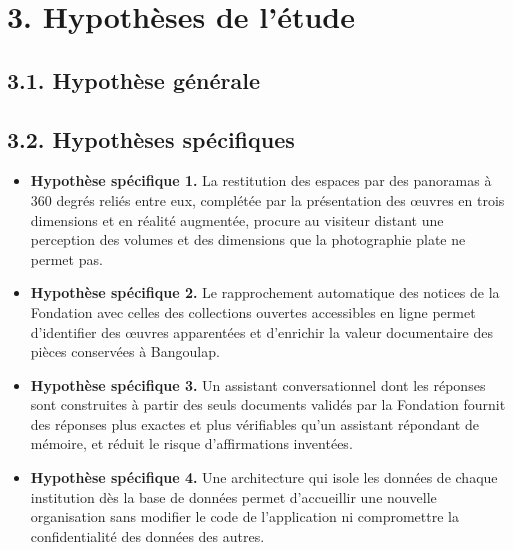 \section*{3. Hypothèses de l'étude}

\subsection*{3.1. Hypothèse générale}


\subsection*{3.2. Hypothèses spécifiques}

\begin{itemize}[label={},leftmargin=0pt,itemsep=5pt,topsep=4pt,parsep=0pt]
  \item \textbf{Hypothèse spécifique 1.} La restitution des espaces par des panoramas à 360 degrés
        reliés entre eux, complétée par la présentation des œuvres en trois
        dimensions et en réalité augmentée, procure au visiteur distant une
        perception des volumes et des dimensions que la photographie plate ne
        permet pas.

  \item \textbf{Hypothèse spécifique 2.} Le rapprochement automatique des notices de la Fondation
        avec celles des collections ouvertes accessibles en ligne permet
        d'identifier des œuvres apparentées et d'enrichir la valeur documentaire
        des pièces conservées à Bangoulap.

  \item \textbf{Hypothèse spécifique 3.} Un assistant conversationnel dont les réponses sont
        construites à partir des seuls documents validés par la Fondation
        fournit des réponses plus exactes et plus vérifiables qu'un assistant
        répondant de mémoire, et réduit le risque d'affirmations inventées.

  \item \textbf{Hypothèse spécifique 4.} Une architecture qui isole les données de chaque
        institution dès la base de données permet d'accueillir une nouvelle
        organisation sans modifier le code de l'application ni compromettre la
        confidentialité des données des autres.
\end{itemize}

